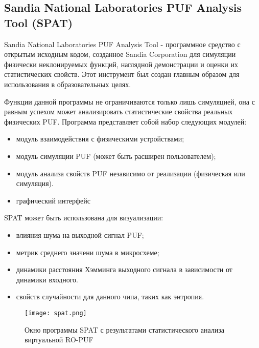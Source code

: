 \subsection{Sandia National Laboratories PUF Analysis Tool (SPAT)}
\label{sec:techs:spat}
Sandia National Laboratories PUF Analysis Tool - программное средство с открытым исходным кодом, созданное Sandia Corporation для симуляции физически неклонируемых функций, наглядной демонстрации и оценки их статистических свойств. Этот инструмент был создан главным образом для использования в образовательных целях.

Функции данной программы не ограничиваются только лишь симуляцией, она с равным успехом может анализировать статистические свойства реальных физических PUF.
Программа представляет собой набор следующих модулей:
\begin{itemize}
  \item модуль взаимодействия с физическими устройствами;
  \item модуль симуляции PUF (может быть расширен пользователем);
  \item модуль анализа свойств PUF независимо от реализации (физическая или симуляция).
  \item графический интерфейс
\end{itemize}
SPAT может быть использована для визуализации:
\begin{itemize}
  \item влияния шума на выходной сигнал PUF;
  \item метрик среднего значени шума в микросхеме;
  \item динамики расстояния Хэмминга выходного сигнала в зависимости от динамики входного.
  \item свойств случайности для данного чипа, таких как энтропия.
\end{itemize}
\begin{figure}[ht]
    \centering
    \texttt{[image: spat.png]}
    \caption{Окно программы SPAT с результатами статистического анализа виртуальной RO-PUF}
    \label{fig:techs:spat}
\end{figure}
